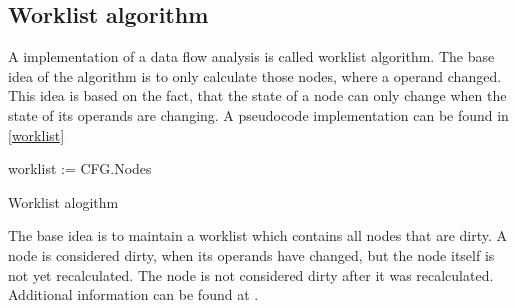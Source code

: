 
\subsection{Worklist algorithm}

A implementation of a data flow analysis is called worklist algorithm. The base idea of the algorithm is to only calculate those nodes, where a operand changed. This idea is based on the fact, that the state of a node can only change when the state of its operands are changing. A pseudocode implementation can be found in \autoref{worklist}

\begin{algorithm}[H]
	worklist := {CFG.Nodes}\;
	\caption{Worklist alogithm}
	\label{worklist}
\end{algorithm}

The base idea is to maintain a worklist which contains all nodes that are dirty. A node is considered dirty, when its operands have changed, but the node itself is not yet recalculated. The node is not considered dirty after it was recalculated.
Additional information can be found at \cite{iterative-data-flow-analysis-revisited}.
